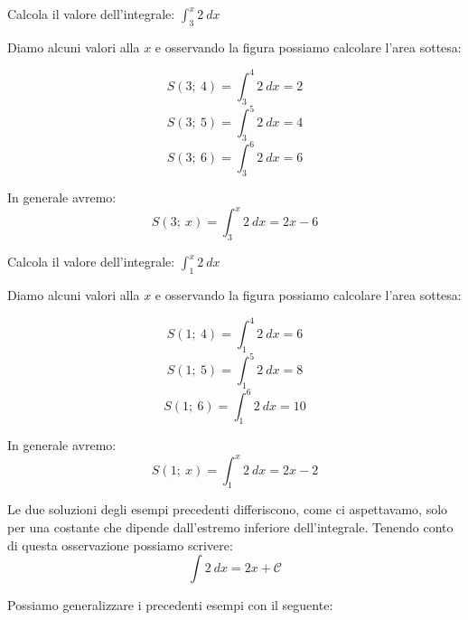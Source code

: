 \begin{esempio}
Calcola il valore dell'integrale: \(\int_3^x 2~dx\)

Diamo alcuni valori alla \(x\) e osservando la figura possiamo calcolare 
l'area sottesa:

\begin{minipage}{.59 \textwidth} 
\[S(3;~4) = \int_3^4 2~dx = 2\] 
\[S(3;~5) = \int_3^5 2~dx = 4\] 
\[S(3;~6) = \int_3^6 2~dx = 6\]

In generale avremo: 
\[S(3;~x) = \int_3^x 2~dx = 2x -6\]
\end{minipage}
\hfill
\begin{minipage}{.39 \textwidth}
\begin{inaccessibleblock}[] 
  \begin{center}  \end{center}
\end{inaccessibleblock}
\end{minipage}
\end{esempio}

\begin{esempio}
Calcola il valore dell'integrale: \(\int_1^x 2~dx\)

Diamo alcuni valori alla \(x\) e osservando la figura possiamo calcolare 
l'area sottesa:

\begin{minipage}{.59 \textwidth} 
\[S(1;~4) = \int_1^4 2~dx = 6\] 
\[S(1;~5) = \int_1^5 2~dx = 8\] 
\[S(1;~6) = \int_1^6 2~dx = 10\]

In generale avremo: 
\[S(1;~x) = \int_1^x 2~dx = 2x -2\]
\end{minipage}
\hfill
\begin{minipage}{.39 \textwidth}
\begin{inaccessibleblock}[] 
  \begin{center}  \end{center}
\end{inaccessibleblock}
\end{minipage}
\end{esempio}

Le due soluzioni degli esempi precedenti differiscono, come ci aspettavamo, 
solo per una costante che dipende dall'estremo inferiore dell'integrale. 
Tenendo conto di questa osservazione possiamo scrivere:
\[\int 2~dx = 2x + \mathcal{C}\]

Possiamo generalizzare i precedenti esempi con il seguente:

